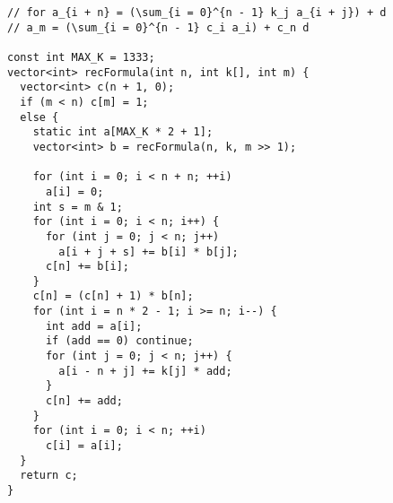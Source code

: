 \begin{lstlisting}
// for a_{i + n} = (\sum_{i = 0}^{n - 1} k_j a_{i + j}) + d
// a_m = (\sum_{i = 0}^{n - 1} c_i a_i) + c_n d

const int MAX_K = 1333;
vector<int> recFormula(int n, int k[], int m) {
  vector<int> c(n + 1, 0);
  if (m < n) c[m] = 1;
  else {
    static int a[MAX_K * 2 + 1];
    vector<int> b = recFormula(n, k, m >> 1);

    for (int i = 0; i < n + n; ++i)
      a[i] = 0;
    int s = m & 1;
    for (int i = 0; i < n; i++) {
      for (int j = 0; j < n; j++)
        a[i + j + s] += b[i] * b[j];
      c[n] += b[i];
    }
    c[n] = (c[n] + 1) * b[n];
    for (int i = n * 2 - 1; i >= n; i--) {
      int add = a[i];
      if (add == 0) continue;
      for (int j = 0; j < n; j++) {
        a[i - n + j] += k[j] * add;
      }
      c[n] += add;
    }
    for (int i = 0; i < n; ++i)
      c[i] = a[i];
  }
  return c;
}

\end{lstlisting}